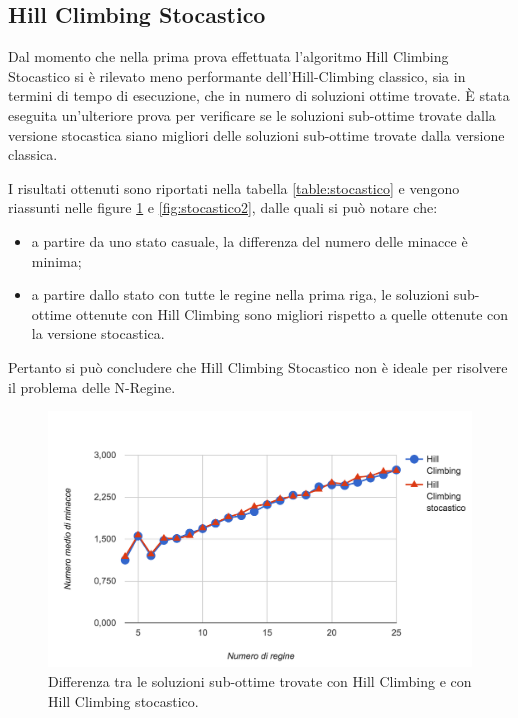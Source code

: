 \FloatBarrier
\subsection{Hill Climbing Stocastico}\label{prove:stocastico}

Dal momento che nella prima prova effettuata l'algoritmo Hill Climbing Stocastico si è rilevato meno performante dell'Hill-Climbing classico, sia in termini di tempo di esecuzione, che in numero di soluzioni ottime trovate. \`{E} stata eseguita un'ulteriore prova per verificare se le soluzioni sub-ottime trovate dalla versione stocastica siano  migliori delle soluzioni sub-ottime trovate dalla versione classica.

I risultati ottenuti sono riportati nella tabella \ref{table:stocastico} e vengono riassunti nelle figure \ref{fig:stocastico1} e \ref{fig:stocastico2}, dalle quali si può notare che:

\begin{itemize}
\item a partire da uno stato casuale, la differenza del numero delle minacce è minima;
\item a partire dallo stato con tutte le regine nella prima riga, le soluzioni sub-ottime ottenute con Hill Climbing sono migliori rispetto a quelle ottenute con la versione stocastica. 
\end{itemize}

Pertanto si può concludere che Hill Climbing Stocastico non è ideale per risolvere il problema delle N-Regine.

\begin{figure}[ht]
\centering
\includegraphics[width=\textwidth]{./immagini/stocastico1.png}
\caption{Differenza tra le soluzioni sub-ottime trovate con Hill Climbing e con Hill Climbing stocastico.}
\label{fig:stocastico1}
\end{figure}

